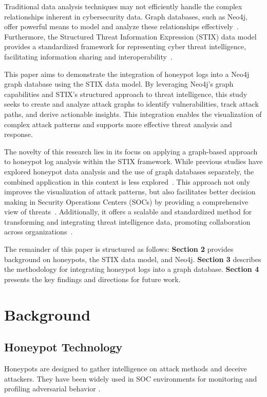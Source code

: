 \documentclass[conference]{IEEEtran}
\begin{document}
Traditional data analysis techniques may not efficiently handle the complex relationships inherent in cybersecurity data. Graph databases, such as Neo4j, offer powerful means to model and analyze these relationships effectively~\cite{robinson2015graph}. Furthermore, the Structured Threat Information Expression (STIX) data model provides a standardized framework for representing cyber threat intelligence, facilitating information sharing and interoperability~\cite{oasis2023stix}.

This paper aims to demonstrate the integration of honeypot logs into a Neo4j graph database using the STIX data model. By leveraging Neo4j's graph capabilities and STIX's structured approach to threat intelligence, this study seeks to create and analyze attack graphs to identify vulnerabilities, track attack paths, and derive actionable insights. This integration enables the visualization of complex attack patterns and supports more effective threat analysis and response.

The novelty of this research lies in its focus on applying a graph-based approach to honeypot log analysis within the STIX framework. While previous studies have explored honeypot data analysis and the use of graph databases separately, the combined application in this context is less explored~\cite{sharma2018utilizing}. This approach not only improves the visualization of attack patterns, but also facilitates better decision making in Security Operations Centers (SOCs) by providing a comprehensive view of threats~\cite{ring2019survey}. Additionally, it offers a scalable and standardized method for transforming and integrating threat intelligence data, promoting collaboration across organizations~\cite{barnum2012standardizing}.

The remainder of this paper is structured as follows: \textbf{Section 2} provides background on honeypots, the STIX data model, and Neo4j. \textbf{Section 3} describes the methodology for integrating honeypot logs into a graph database. \textbf{Section 4} presents the key findings and directions for future work.




\section{Background}
\subsection{Honeypot Technology}
Honeypots are designed to gather intelligence on attack methods and deceive attackers. They have been widely used in SOC environments for monitoring and profiling adversarial behavior \cite{honeypotsurvey}.
\end{document}
